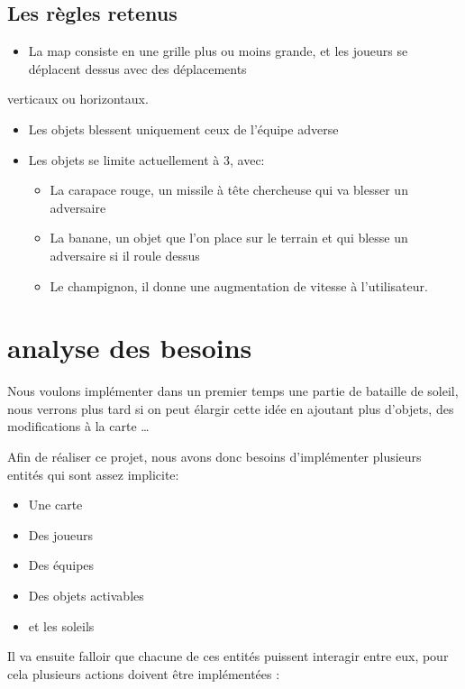 \documentclass[11pt]{article}
\begin{document}
\subsection{Les règles retenus}
\label{sec:org0d02d91}

\begin{itemize}
\item La map consiste en une grille plus ou moins grande, et les joueurs se déplacent dessus avec des déplacements
\end{itemize}
verticaux ou horizontaux.
\begin{itemize}
\item Les objets blessent uniquement ceux de l'équipe adverse
\item Les objets se limite actuellement à 3, avec:
\begin{itemize}
\item La carapace rouge, un missile à tête chercheuse qui va blesser un adversaire
\item La banane, un objet que l'on place sur le terrain et qui blesse un adversaire si il roule dessus
\item Le champignon, il donne une augmentation de vitesse à l'utilisateur.
\end{itemize}
\end{itemize}

\section{analyse des besoins}
\label{sec:orgdca7906}

Nous voulons implémenter dans un premier temps une partie de bataille de soleil, nous verrons plus tard si on peut élargir cette idée en ajoutant plus d'objets, des modifications à la carte \ldots{}


Afin de réaliser ce projet, nous avons donc besoins d'implémenter plusieurs entités qui sont assez implicite:

\begin{itemize}
\item Une carte
\item Des joueurs
\item Des équipes
\item Des objets activables
\item et les soleils
\end{itemize}

Il va ensuite falloir que chacune de ces entités puissent interagir entre eux, pour cela plusieurs actions doivent
être implémentées :
\end{document}
